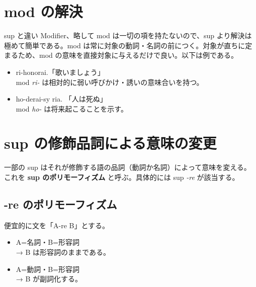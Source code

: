 \section{mod の解決}

sup と違い Modifier、略して mod は一切の項を持たないので、sup より解決は極めて簡単である。mod は常に対象の動詞・名詞の前につく。対象が直ちに定まるため、mod の意味を直接対象に与えるだけで良い。以下は例である。

\begin{itemize}
    \item ri-honorai.「歌いましょう」\\ mod \emph{ri-} は相対的に弱い呼びかけ・誘いの意味合いを持つ。
    \item ho-derai-sy ria. 「人は死ぬ」\\ mod \emph{ho-} は将来起こることを示す。
\end{itemize}

\section{sup の修飾品詞による意味の変更}

一部の sup はそれが修飾する語の品詞（動詞か名詞）によって意味を変える。これを \textbf{sup のポリモーフィズム} と呼ぶ。具体的には sup \emph{-re} が該当する。

\subsection{-re のポリモーフィズム}

便宜的に文を「A-re B」とする。

\begin{itemize}
    \item A=名詞・B=形容詞 \\ → B は形容詞のままである。
    \item A=動詞・B=形容詞 \\ → B が副詞化する。
\end{itemize}